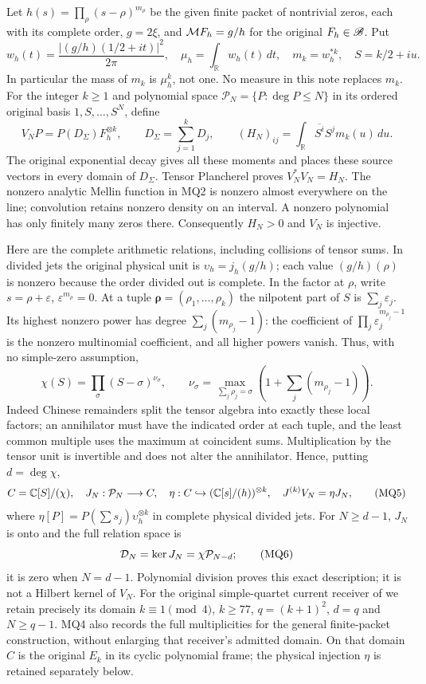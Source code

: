 \documentclass[11pt]{article}
\begin{document}
Let $h(s)=\prod_\rho(s-\rho)^{m_\rho}$ be the given finite packet
of nontrivial zeros, each with its complete order, $g=2\xi$, and
$\mathcal M F_h=g/h$ for the original $F_h\in\mathscr B$. Put
\[
 w_h(t)=\frac{|(g/h)(1/2+it)|^2}{2\pi},\quad
 \mu_h=\int_{\mathbb R}w_h(t)\,dt,\quad
 m_k=w_h^{*k},\quad S=k/2+iu.                              \tag{MQ2}
\]
In particular the mass of $m_k$ is $\mu_h^k$, not one. No measure
in this note replaces $m_k$. For the integer $k\ge1$ and polynomial
space $\mathcal P_N=\{P:\deg P\le N\}$ in its ordered original
basis $1,S,\ldots,S^N$, define
\[
 V_NP=P(D_\Sigma)F_h^{\otimes k},\qquad
 D_\Sigma=\sum_{j=1}^kD_j,\qquad
 (H_N)_{ij}=\int_{\mathbb R}\overline{S^i}S^j m_k(u)\,du.
                                                               \tag{MQ3}
\]
The original exponential decay gives all these moments and places
these source vectors in every domain of $D_\Sigma$. Tensor
Plancherel proves $V_N^*V_N=H_N$. The nonzero analytic Mellin
function in MQ2 is nonzero almost everywhere on the line;
convolution retains nonzero density on an interval. A nonzero
polynomial has only finitely many zeros there. Consequently
$H_N>0$ and $V_N$ is injective.

Here are the complete arithmetic relations, including collisions of
tensor sums. In divided jets the original physical unit is
$\upsilon_h=j_h(g/h)$; each value $(g/h)(\rho)$ is nonzero because
the order divided out is complete. In the factor at $\rho$, write
$s=\rho+\varepsilon$, $\varepsilon^{m_\rho}=0$. At a tuple
$\boldsymbol\rho=(\rho_1,\ldots,\rho_k)$ the nilpotent part of
$S$ is $\sum_j\varepsilon_j$. Its highest nonzero power has degree
$\sum_j(m_{\rho_j}-1)$: the coefficient of
$\prod_j\varepsilon_j^{m_{\rho_j}-1}$ is the nonzero multinomial
coefficient, and all higher powers vanish. Thus, with no simple-zero
assumption,
\[
 \chi(S)=\prod_\sigma(S-\sigma)^{\nu_\sigma},\qquad
 \nu_\sigma=\max_{\sum_j\rho_j=\sigma}
       \left(1+\sum_j(m_{\rho_j}-1)\right).                    \tag{MQ4}
\]
Indeed Chinese remainders split the tensor algebra into exactly
these local factors; an annihilator must have the indicated order
at each tuple, and the least common multiple uses the maximum at
coincident sums. Multiplication by the tensor unit is invertible and
does not alter the annihilator. Hence, putting $d=\deg\chi$,
\[
 C=\mathbb C[S]/(\chi),\quad J_N:\mathcal P_N\longrightarrow C,
 \quad \eta:C\hookrightarrow(\mathbb C[s]/(h))^{\otimes k},\quad
 J^{(k)}V_N=\eta J_N,                                       \tag{MQ5}
\]
where $\eta[P]=P(\sum s_j)\upsilon_h^{\otimes k}$ in complete
physical divided jets. For $N\ge d-1$, $J_N$ is onto and the full
relation space is
\[
 \mathcal D_N=\ker J_N=\chi\mathcal P_{N-d};                         \tag{MQ6}
\]
it is zero when $N=d-1$. Polynomial division proves this exact
description; it is not a Hilbert kernel of $V_N$.
For the original simple-quartet current receiver of \cite{swmix:PD} we
retain precisely its domain $k\equiv1\pmod4$, $k\ge77$,
$q=(k+1)^2$, $d=q$ and $N\ge q-1$. MQ4 also records the full
multiplicities for the general finite-packet construction, without
enlarging that receiver's admitted domain.
On that domain $C$ is the original $E_k$ in its cyclic polynomial
frame; the physical injection $\eta$ is retained separately below.
\end{document}
